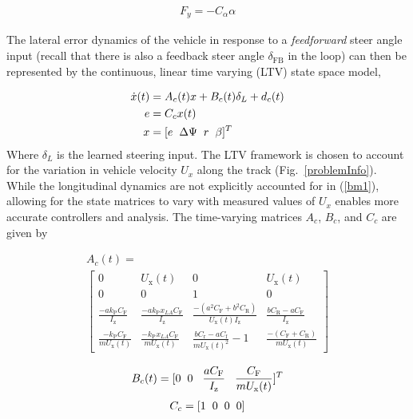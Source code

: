 \documentclass[letterpaper, 10 pt, conference]{ieeeconf}  %
\begin{document}
\begin{align}
	F_y = -C_\alpha\alpha
\end{align}

The lateral error dynamics of the vehicle in response to a \textit{feedforward} steer angle input (recall that there is also a feedback steer angle $\delta_\mathrm{FB}$ in the loop)
 can then be represented by the continuous, linear time varying (LTV) state space model,

\begin{subequations}
\label{eq:cts}
\begin{align}
	\dot{x}(t) &= A_c(t) x + B_c(t)\delta_L + d_c(t)\\
	 e &= C_cx(t)\\
	 x &= [e \hspace{2mm} \Delta\Psi \hspace{2mm} r \hspace{2mm} \beta]^T
\end{align}
\end{subequations}
Where $\delta_L$ is the learned steering input. The LTV framework is chosen to account for the variation in vehicle 
velocity $U_x$ along the track (Fig.~\ref{problemInfo}). While the longitudinal dynamics are not explicitly accounted for in (\ref{bm1}), 
allowing for the state matrices to vary with measured values of $U_x$ enables more accurate controllers and analysis. The time-varying matrices $A_c$, $B_c$, and $C_c$ are given by

\begin{multline}
\label{eqn:Amatrix}
A_c(t)  =  \\
\left[\begin{smallmatrix}
  0 & U_\mathrm{x}(t) & 0 & U_\mathrm{x}(t) \\ 
  0 & 0 & 1 & 0 \\ 
  \frac{-ak_\mathrm{P} C_\mathrm{F}}{I_\mathrm{z}}  & \frac{-ak_\mathrm{P}x_{LA}C_\mathrm{F}}{I_\mathrm{z}}  & \frac{-(a^2C_\mathrm{F}+b^2C_\mathrm{R})}{U_\mathrm{x}(t)I_\mathrm{z}} & \frac{bC_\mathrm{R} - aC_\mathrm{F}}{I_\mathrm{z}}  \\
  \frac{-k_\mathrm{P}C_\mathrm{F}}{mU_\mathrm{x}(t)}  & \frac{-k_\mathrm{P}x_{LA}C_\mathrm{F}}{mU_\mathrm{x}(t)}  & \frac{bC_\mathrm{r}-aC_\mathrm{f}}{mU_\mathrm{x}(t)^2}-1 & \frac{-(C_\mathrm{F} + C_\mathrm{R})}{mU_\mathrm{x}(t)}
 \end{smallmatrix}\right]
 \end{multline}

\begin{align}
B_c(t) =[0 \hspace{2 mm} 0 \hspace{3 mm} \frac{a C_\mathrm{F}}{I_\mathrm{z}} \hspace{3 mm}  \frac{C_\mathrm{F}}{mU_\mathrm{x}(t)}]^T
\end {align}
\begin{align}
C_c =[1 \hspace{2 mm} 0 \hspace{2 mm} 0 \hspace{2 mm} 0]
\end{align}
\end{document}
